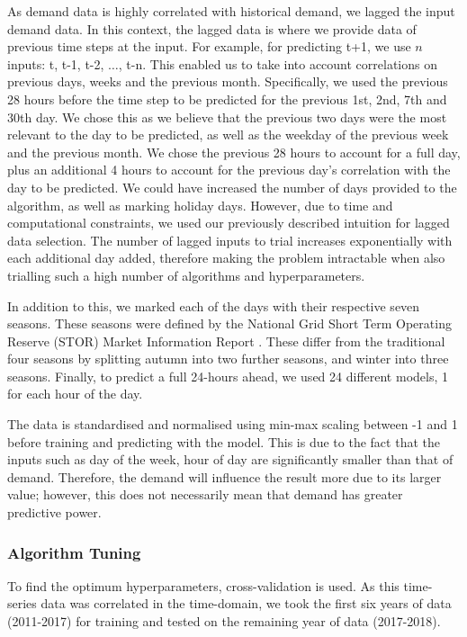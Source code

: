 As demand data is highly correlated with historical demand, we lagged the input demand data. In this context, the lagged data is where we provide data of previous time steps at the input. For example, for predicting t+1, we use $n$ inputs: {t, t-1, t-2, $\ldots$, t-n}. This enabled us to take into account correlations on previous days, weeks and the previous month. Specifically, we used the previous 28 hours before the time step to be predicted for the previous 1st, 2nd, 7th and 30th day. We chose this as we believe that the previous two days were the most relevant to the day to be predicted, as well as the weekday of the previous week and the previous month. We chose the previous 28 hours to account for a full day, plus an additional 4 hours to account for the previous day's correlation with the day to be predicted. We could have increased the number of days provided to the algorithm, as well as marking holiday days. However, due to time and computational constraints, we used our previously described intuition for lagged data selection. The number of lagged inputs to trial increases exponentially with each additional day added, therefore making the problem intractable when also trialling such a high number of algorithms and hyperparameters. 

In addition to this, we marked each of the days with their respective seven seasons. These seasons were defined by the National Grid Short Term Operating Reserve (STOR) Market Information Report \cite{ESO2019}. These differ from the traditional four seasons by splitting autumn into two further seasons, and winter into three seasons. Finally, to predict a full 24-hours ahead, we used 24 different models, 1 for each hour of the day. 


The data is standardised and normalised using min-max scaling between -1 and 1 before training and predicting with the model. This is due to the fact that the inputs such as day of the week, hour of day are significantly smaller than that of demand. Therefore, the demand will influence the result more due to its larger value; however, this does not necessarily mean that demand has greater predictive power.

\subsubsection{Algorithm Tuning}

To find the optimum hyperparameters, cross-validation is used. As this time-series data was correlated in the time-domain, we took the first six years of data (2011-2017) for training and tested on the remaining year of data (2017-2018).

